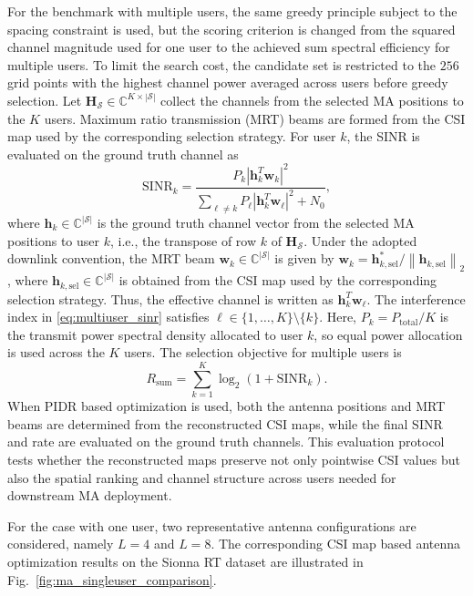 \documentclass[lettersize,journal]{IEEEtran}
\newcommand{\vect}[1]{\boldsymbol{#1}}
\newcommand{\mat}[1]{\mathbf{#1}}
\newcommand{\norm}[1]{\left\lVert #1 \right\rVert}
\begin{document}
For the benchmark with multiple users, the same greedy principle subject to the spacing constraint is used, but the scoring criterion is changed from the squared channel magnitude used for one user to the achieved sum spectral efficiency for multiple users. To limit the search cost, the candidate set is restricted to the $256$ grid points with the highest channel power averaged across users before greedy selection. Let $\mat{H}_{\mathcal{S}}\in\mathbb{C}^{K\times |\mathcal{S}|}$ collect the channels from the selected MA positions to the $K$ users. Maximum ratio transmission (MRT) beams are formed from the CSI map used by the corresponding selection strategy. For user $k$, the SINR is evaluated on the ground truth channel as
\begin{equation}
	\mathrm{SINR}_k=
	\frac{P_k|\vect{h}_k^T\vect{w}_k|^2}
	{\sum_{\ell\ne k}P_{\ell}|\vect{h}_k^T\vect{w}_{\ell}|^2+N_0},
	\label{eq:multiuser_sinr}
\end{equation}
where $\vect{h}_k\in\mathbb{C}^{|\mathcal{S}|}$ is the ground truth channel vector from the selected MA positions to user $k$, i.e., the transpose of row $k$ of $\mat{H}_{\mathcal{S}}$. Under the adopted downlink convention, the MRT beam $\vect{w}_k\in\mathbb{C}^{|\mathcal{S}|}$ is given by $\vect{w}_k=\vect{h}_{k,\mathrm{sel}}^*/\norm{\vect{h}_{k,\mathrm{sel}}}_2$, where $\vect{h}_{k,\mathrm{sel}}\in\mathbb{C}^{|\mathcal{S}|}$ is obtained from the CSI map used by the corresponding selection strategy. Thus, the effective channel is written as $\vect{h}_k^T\vect{w}_{\ell}$. The interference index in \eqref{eq:multiuser_sinr} satisfies $\ell\in\{1,\ldots,K\}\setminus\{k\}$. Here, $P_k=P_{\mathrm{total}}/K$ is the transmit power spectral density allocated to user $k$, so equal power allocation is used across the $K$ users. The selection objective for multiple users is
\begin{equation}
	R_{\mathrm{sum}}=\sum_{k=1}^{K}\log_2(1+\mathrm{SINR}_k).
	\label{eq:multiuser_sum_rate}
\end{equation}
When PIDR based optimization is used, both the antenna positions and MRT beams are determined from the reconstructed CSI maps, while the final SINR and rate are evaluated on the ground truth channels. This evaluation protocol tests whether the reconstructed maps preserve not only pointwise CSI values but also the spatial ranking and channel structure across users needed for downstream MA deployment.

For the case with one user, two representative antenna configurations are considered, namely $L=4$ and $L=8$. The corresponding CSI map based antenna optimization results on the Sionna RT dataset are illustrated in Fig.~\ref{fig:ma_singleuser_comparison}.
\end{document}
